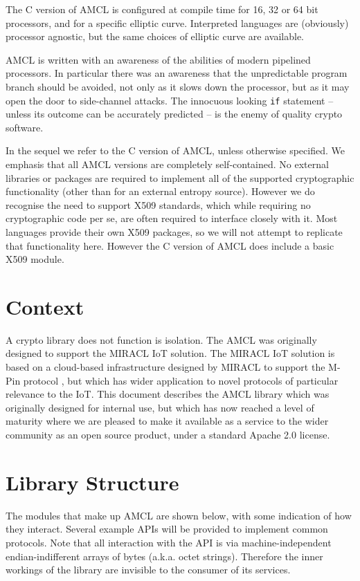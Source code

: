 \documentclass{llncs}
\begin{document}
The C version of AMCL is configured at compile time for 16, 32 or 64 bit processors, and for a specific elliptic curve. Interpreted languages are (obviously) processor agnostic, 
but the same choices of elliptic curve are available.

AMCL is written with an awareness of the abilities of modern pipelined processors. In particular there was an awareness that the unpredictable program branch should be avoided, not 
only as it slows down the processor, but as it may open the door to side-channel attacks. The innocuous looking {\tt if} statement -- unless its outcome can be accurately predicted -- is the enemy 
of quality crypto software.

In the sequel we refer to the C version of AMCL, unless otherwise specified. We emphasis that all AMCL versions are completely self-contained. No external 
libraries or packages are required to implement all of the supported cryptographic functionality (other than for an external entropy source). However we do recognise the need to
support X509 standards, which while requiring no cryptographic code per se, are often required to interface closely with it. Most languages provide their own X509 packages, so we will not
attempt to replicate that functionality here. However the C version of AMCL does include a basic X509 module.

\section{Context}

A crypto library does not function is isolation. The AMCL was originally designed to support the MIRACL IoT solution. The MIRACL IoT solution is based on a cloud-based infrastructure designed by MIRACL 
to support the M-Pin protocol \cite{mpin}, but which has wider application to novel protocols of particular relevance to the IoT. This document describes the AMCL library which was originally designed for internal use, 
but which has now reached a level of maturity where we are pleased to make it available as a service to the wider community as an open source product, under a standard Apache 2.0 license.

\section{Library Structure}

The modules that make up AMCL are shown below, with some indication of how they interact. Several example APIs will be provided to implement common protocols. Note that all
interaction with the API is via machine-independent endian-indifferent arrays of bytes (a.k.a. octet strings). 
Therefore the inner workings of the library are invisible to the consumer of its services.
\end{document}
